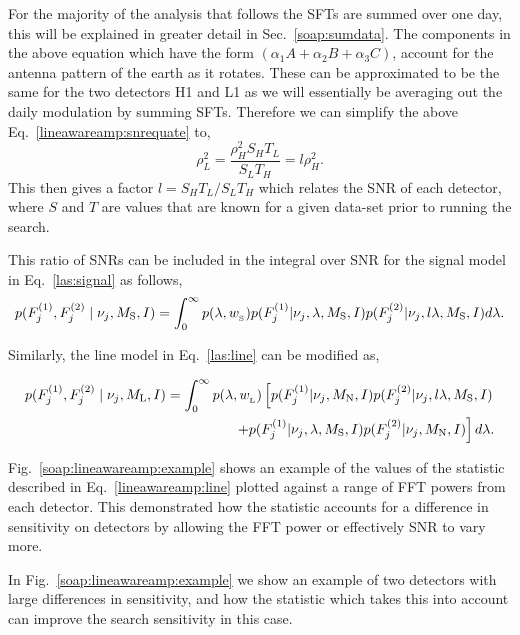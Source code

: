 For the majority of the analysis that follows the \glspl{SFT} are summed over one day, this will be explained in greater detail in Sec.~\ref{soap:sumdata}. 
The components in the above equation which have the form $(\alpha_1A + \alpha_2B + \alpha_3C)$, account for the antenna pattern of the earth as it rotates.
These can be approximated to be the same for the two detectors H1 and L1 as we will essentially be averaging out the daily modulation by summing \glspl{SFT}.
Therefore we can simplify the above Eq.~\ref{lineawareamp:snrequate} to, 
\begin{equation}
\label{lineawareamp:snrratio}
    \rho_L^2 = \frac{\rho_H^2 S_H T_L}{S_L T_H} = l \rho_H^2 .
\end{equation}
This then gives a factor $l = S_H T_L/S_L T_H$ which relates the \gls{SNR} of each detector, where $S$ and $T$ are values that are known for a given data-set prior to running the search.

This ratio of \glspl{SNR} can be included in the integral over \gls{SNR} for the signal model in Eq.~\ref{las:signal} as follows,
\begin{equation}
\label{lineawareamp:signal}
p(F^{(1)}_{j},F^{(2)}_{j} \mid \nu_j,M_{\rm{S}},I) = \int_0^{\infty}  p(\lambda,w_{\rm_S}) 
p(F^{(1)}_{j}|\nu_j,\lambda,M_{\text{S}},I)p(F^{(2)}_{j}|\nu_j,l\lambda,M_{\text{S}},I) d\lambda.
\end{equation}

Similarly, the line model in Eq.~\ref{las:line} can be modified as,

\begin{equation}
\label{lineawareamp:line}
\begin{split}
p(F^{(1)}_{j},F^{(2)}_{j} \mid \nu_j,M_{\rm{L}},I) = \int_0^{\infty}  p(\lambda,w_{\rm_L}) 
\left[ p(F^{(1)}_{j}|\nu_j,M_{\rm{N}},I)p(F^{(2)}_{j}|\nu_j,l\lambda,M_{\rm{S}},I) \right. \\
\left. + p(F^{(1)}_{j}|\nu_j,\lambda,M_{\rm{S}},I)p(F^{(2)}_{j}|\nu_j,M_{\rm{N}},I)\right]d\lambda .
\end{split}
\end{equation}

Fig.~\ref{soap:lineawareamp:example} shows an example of the values of the statistic described in Eq.~\ref{lineawareamp:line} plotted against a range of \gls{FFT} powers from each detector. This demonstrated how the statistic accounts for a difference in sensitivity on detectors by allowing the \gls{FFT} power or effectively \gls{SNR} to vary more.

In Fig.~\ref{soap:lineawareamp:example} we show an example of two detectors with large differences in sensitivity, and how the statistic which takes this into account can improve the search sensitivity in this case.

